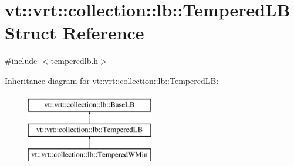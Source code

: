 \hypertarget{structvt_1_1vrt_1_1collection_1_1lb_1_1_tempered_l_b}{}\section{vt\+:\+:vrt\+:\+:collection\+:\+:lb\+:\+:Tempered\+LB Struct Reference}
\label{structvt_1_1vrt_1_1collection_1_1lb_1_1_tempered_l_b}


{\ttfamily \#include $<$temperedlb.\+h$>$}

Inheritance diagram for vt\+:\+:vrt\+:\+:collection\+:\+:lb\+:\+:Tempered\+LB\+:\begin{figure}[H]
\begin{center}
\leavevmode
\includegraphics[height=3.000000cm]{structvt_1_1vrt_1_1collection_1_1lb_1_1_tempered_l_b}
\end{center}
\end{figure}
